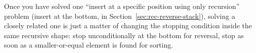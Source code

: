 \begin{takeawaybox}
Once you have solved one ``insert at a specific position using only
recursion'' problem (insert at the bottom, in
Section~\ref{sec:rec-reverse-stack}), solving a closely related one is
just a matter of changing the stopping condition inside the same
recursive shape: stop unconditionally at the bottom for reversal, stop as
soon as a smaller-or-equal element is found for sorting.
\end{takeawaybox}
